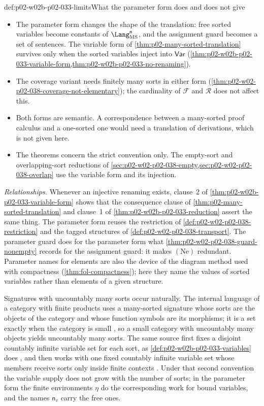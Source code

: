 \begin{hbwarning}{def:p02-w02b-p02-033-limits}{What the parameter form does and does not give}
\begin{itemize}
\item The parameter form changes the shape of the translation: free sorted
      variables become constants of \(\Lang_{\mathrm{MS}}^{\mathsf n}\), and
      the assignment guard becomes a set of sentences.  The variable form of
      \cref{thm:p02-many-sorted-translation} survives only when the sorted
      variables inject into \(\mathsf{Var}\)
      (\cref{thm:p02-w02b-p02-033-variable-form,thm:p02-w02b-p02-033-no-renaming}).
\item The coverage variant needs finitely many sorts in either form
      (\cref{thm:p02-w02-p02-038-coverage-not-elementary}); the cardinality of
      \(\mathcal F\) and \(\mathcal R\) does not affect this.
\item Both forms are semantic.  A correspondence between a many-sorted proof
      calculus and a one-sorted one would need a translation of derivations,
      which is not given here.
\item The theorems concern the strict convention only.  The empty-sort and
      overlapping-sort reductions of
      \cref{sec:p02-w02-p02-038-empty,sec:p02-w02-p02-038-overlap} use the
      variable form and its injection.
\end{itemize}
\end{hbwarning}

\emph{Relationships.}  Whenever an injective renaming exists, clause~2 of
\cref{thm:p02-w02b-p02-033-variable-form} shows that the consequence clause
of \cref{thm:p02-many-sorted-translation} and clause~1 of
\cref{thm:p02-w02b-p02-033-reduction} assert the same thing.  The parameter
form reuses the restriction of \cref{def:p02-w02-p02-038-restriction} and the
tagged structures of \cref{def:p02-w02-p02-038-transport}.  The parameter
guard does for the parameter form what
\cref{thm:p02-w02-p02-038-guard-nonempty} records for the assignment guard:
it makes \((\mathrm{Ne})\) redundant.  Parameter names for elements are also
the device of the diagram method used with compactness
(\cref{thm:fol-compactness}); here they name the values of sorted variables
rather than elements of a given structure.

Signatures with uncountably many sorts occur naturally.  The internal
language of a category with finite products uses a many-sorted signature
whose sorts are the objects of the category and whose function symbols are
its morphisms; it is a set exactly when the category is small
\cite[Section~2.3, p.~10]{Pitts1995Draft}, so a small category with
uncountably many objects yields uncountably many sorts.  The same source
first fixes a disjoint countably infinite variable set for each sort, as
\cref{def:p02-w02b-p02-033-variables} does \cite[Section~2, p.~5]{Pitts1995Draft},
and then works with one fixed countably infinite variable set whose members
receive sorts only inside finite contexts
\cite[Section~2.1, Definition~2.1.1, p.~6]{Pitts1995Draft}.  Under that
second convention the variable supply does not grow with the number of sorts;
in the parameter form the finite environments \(\eta\) do the corresponding
work for bound variables, and the names \(\mathsf n_v\) carry the free ones.
